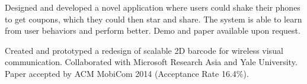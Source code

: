 \begin{resume}

\begin{position}
Designed and developed a novel application where users could shake their phones to get coupons, which they could then star and share. The system is able to learn from user behaviors and perform better. 
Demo and paper available upon request.
\end{position}

\begin{position}
Created and prototyped a redesign of scalable 2D barcode for wireless visual communication. Collaborated with Microsoft Research Asia and Yale University. \\
Paper accepted by ACM MobiCom 2014 (Acceptance Rate 16.4\%).
\end{position}




\end{resume}
